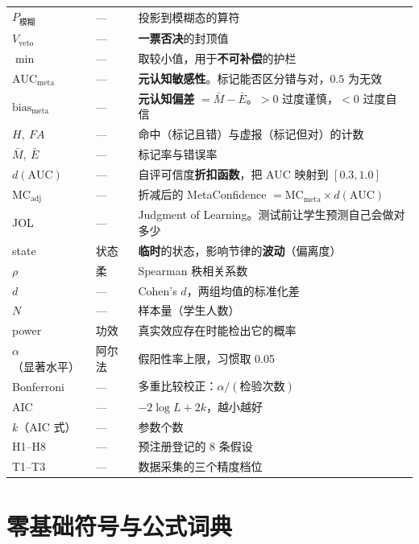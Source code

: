 \documentclass[UTF8,a4paper,11pt]{ctexart}
\begin{document}
\begin{longtable}{@{}p{2.8cm}p{2.2cm}p{9.6cm}@{}}
$P_{\text{模糊}}$ & --- & 投影到模糊态的算符 \\
$V_{\text{veto}}$ & --- & \textbf{一票否决}的封顶值 \\
$\min$ & --- & 取较小值，用于\textbf{不可补偿}的护栏 \\
$\text{AUC}_{\text{meta}}$ & --- & \textbf{元认知敏感性}。标记能否区分错与对，$0.5$ 为无效 \\
$\text{bias}_{\text{meta}}$ & --- & \textbf{元认知偏差} $=\bar M-\bar E$。$>0$ 过度谨慎，$<0$ 过度自信 \\
$H,\ FA$ & --- & 命中（标记且错）与虚报（标记但对）的计数 \\
$\bar M,\ \bar E$ & --- & 标记率与错误率 \\
$d(\text{AUC})$ & --- & 自评可信度\textbf{折扣函数}，把 AUC 映射到 $[0.3,1.0]$ \\
$\text{MC}_{\text{adj}}$ & --- & 折减后的 MetaConfidence $=\text{MC}_{\text{meta}}\times d(\text{AUC})$ \\
JOL & --- & Judgment of Learning。测试前让学生预测自己会做对多少 \\
state & 状态 & \textbf{临时}的状态，影响节律的\textbf{波动}（偏离度） \\
$\rho$ & 柔 & Spearman 秩相关系数 \\
$d$ & --- & Cohen's $d$，两组均值的标准化差 \\
$N$ & --- & 样本量（学生人数） \\
power & 功效 & 真实效应存在时能检出它的概率 \\
$\alpha$（显著水平） & 阿尔法 & 假阳性率上限，习惯取 0.05 \\
Bonferroni & --- & 多重比较校正：$\alpha / (\text{检验次数})$ \\
AIC & --- & $-2\log L + 2k$，越小越好 \\
$k$（AIC 式） & --- & 参数个数 \\
H1--H8 & --- & 预注册登记的 8 条假设 \\
T1--T3 & --- & 数据采集的三个精度档位 \\
\bottomrule
\end{longtable}

\newpage


\section{零基础符号与公式词典}
\begingroup\small
\end{document}
